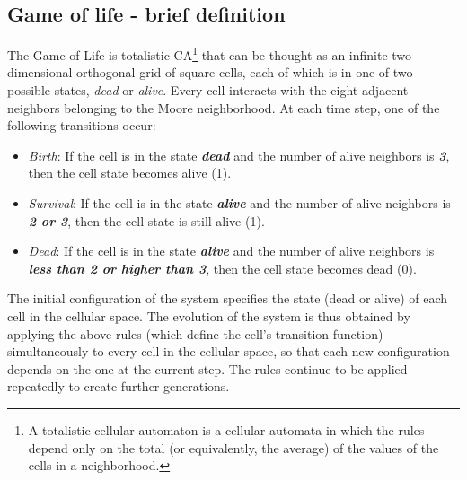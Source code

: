 \subsection{Game of life - brief definition} 
The Game of Life is totalistic CA\footnote{A totalistic cellular automaton is a cellular automata in which the rules depend only on the	total (or equivalently, the average) of the values of the cells in a neighborhood.} that can be thought as an infinite two-dimensional orthogonal grid of square cells, each of which is in one of two possible states, \emph{dead} or \emph{alive}. Every cell interacts with the eight adjacent neighbors belonging to the Moore neighborhood. At each time step, one of the following transitions occur:
	\begin{itemize}
	\item \emph{Birth}: If the cell is in the state \textbf{\textit{dead}} and
	the number of alive neighbors is \textbf{\textit{3}}, then the cell state
	becomes alive (1).
	\item \emph{Survival}: If the cell is in the state \textbf{\textit{alive}}
	and the number of alive neighbors is \textbf{\textit{2 or 3}}, then the cell
	state is still alive (1).
	\item \emph{Dead}: If the cell is in the state \textbf{\textit{alive}} and
	the number of alive neighbors is \textbf{\textit{less than 2 or higher
			than 3}}, then the cell state becomes dead (0).
\end{itemize}
The initial configuration of the system specifies the state (dead
or alive) of each cell in the cellular space. The evolution of the
system is thus obtained by applying the above rules (which define
the cell's transition function) simultaneously to every cell in
the cellular space, so that each new configuration depends on the
one at the current step. The rules continue to be applied
repeatedly to create further generations.

